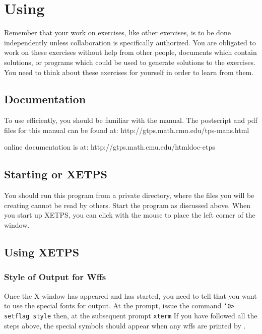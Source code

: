 \documentclass{article}
\begin{document}
\pagebreak

\section{Using {\ETPS}}

Remember that your work on {\ETPS} exercises, like other exercises,
is to be done independently unless collaboration is specifically
authorized. You are obligated to work on these exercises
without help from other people, documents which contain
solutions, or programs which could be used to generate
solutions to the exercises. You need to think about these exercises
for yourself in order to learn from them.

\subsection{Documentation}

To use {\ETPS} efficiently, you should be familiar with the
{\ETPS} manual. The postscript and pdf files for this manual 
can be found at:\newline{}
http://gtps.math.cmu.edu/tps-mans.html

{\ETPS} online documentation is at:\newline{}
http://gtps.math.cmu.edu/htmldoc-etps

\subsection{Starting {\ETPS} or XETPS}

You should run this program from a private directory, where the files
you will be creating cannot be read by others. Start the program as
discussed above. When you start up XETPS, you can click with the mouse
to place the left corner of the window.

\subsection{Using XETPS}

\subsubsection{Style of Output for Wffs}

Once the X-window has appeared and {\ETPS} has started, you need to tell
{\ETPS} that you want to use the special fonts for output.  At the {\ETPS}
prompt, issue the command \newline{}
{\tt {\tt\char`\<}0> setflag style} \newline{}
then, at the subsequent prompt \newline{}
{\tt xterm}\newline{}
If you have followed all the steps
above, the special symbols should appear when any wffs are printed by
{\ETPS}.
\end{document}

